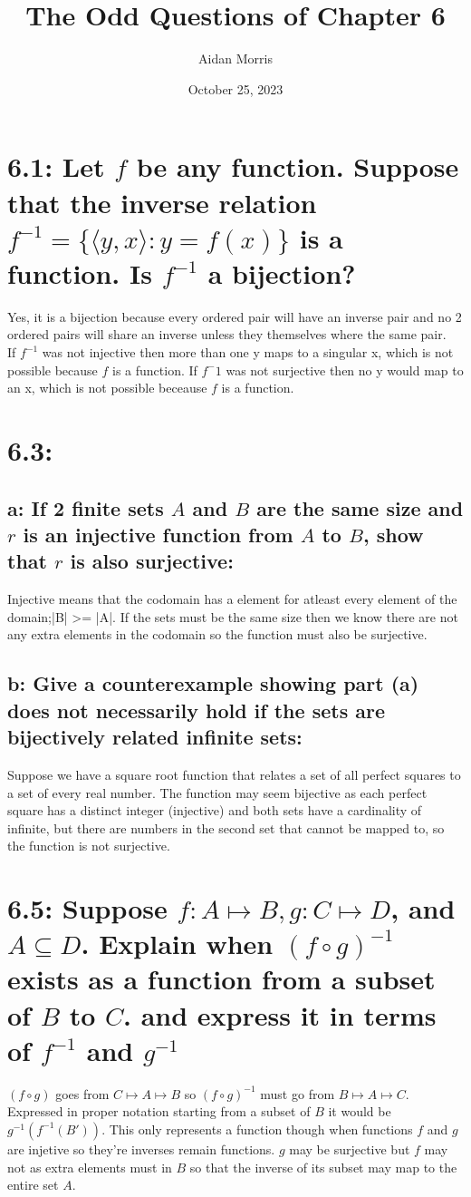\documentclass{article}
\title{The Odd Questions of Chapter 6}
\author{Aidan Morris}
\date{October 25, 2023}
\begin{document}
\maketitle
\pagebreak

\section*{6.1: Let $f$ be any function. Suppose that the inverse relation $f^{-1} = \{\langle y,x \rangle : y = f(x) \}$ is a function. Is $f^{-1}$ a bijection?}
Yes, it is a bijection because every ordered pair will have an inverse pair and no 2 ordered pairs will share an inverse unless they themselves where the same pair.\\
If $f^{-1}$ was not injective then more than one y maps to a singular x, which is not possible because $f$ is a function. If $f^-1$ was not surjective then no y would map to an x, which is not possible beceause $f$ is a function.
\section*{6.3:}
\subsection*{a: If 2 finite sets $A$ and $B$ are the same size and $r$ is an injective function from $A$ to $B$, show that $r$ is also surjective:}
Injective means that the codomain has a element for atleast every element of the domain;|B| >= |A|. If the sets must be the same size then we know there are not any extra elements in the codomain so the function must also be surjective.

\subsection*{b: Give a counterexample showing part (a) does not necessarily hold if the sets are bijectively related infinite sets:}
Suppose we have a square root function that relates a set of all perfect squares to a set of every real number. The function may seem bijective as each perfect square has a distinct integer (injective) and both sets have a cardinality of infinite, but there are numbers in the second set that cannot be mapped to, so the function is not surjective.
\section*{6.5: Suppose $f: A \mapsto B, g: C \mapsto D$, and $A \subseteq D$. Explain when $(f \circ g)^{-1}$ exists as a function from a subset of $B$ to $C$. and express it in terms of $f^{-1}$ and $g^{-1}$}
$(f \circ g)$ goes from $C \mapsto A \mapsto B$ so $(f \circ g)^{-1}$ must go from $B \mapsto A \mapsto C$. Expressed in proper notation starting from a subset of $B$ it would be $g^{-1}(f^{-1}(B'))$. This only represents a function though when functions $f$ and $g$ are injetive so they're inverses remain functions. $g$ may be surjective but $f$ may not as extra elements must in $B$ so that the inverse of its subset may map to the entire set $A$.
\end{document}
